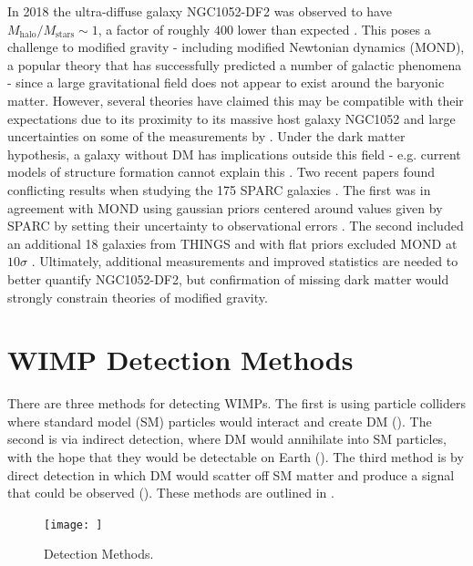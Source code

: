 In 2018 the ultra-diffuse galaxy NGC1052-DF2 was observed to have $M_{\mathrm{halo}} / M_{\mathrm{stars}} \sim 1$, a factor of
roughly $400$
lower than expected .  This poses a challenge to modified gravity - including modified Newtonian
dynamics
(MOND), a popular theory that has successfully predicted a number of galactic phenomena  - since a large
gravitational
field does not appear to exist around the baryonic matter.  However, several theories have claimed this may be compatible with their
expectations due to its proximity to its massive host galaxy NGC1052 and large uncertainties on some of the measurements by
.  Under the dark matter hypothesis, a galaxy without DM has implications outside
this field - e.g. current models of structure formation cannot explain this .  Two recent
papers found conflicting results when studying the 175 SPARC
galaxies .  The first was in agreement with MOND using gaussian priors centered around values given by SPARC by
setting
their uncertainty to observational errors .  The second included an additional 18 galaxies from THINGS
 and with flat priors excluded MOND
at $10 \sigma$ .  Ultimately, additional measurements and improved statistics are needed to better
quantify NGC1052-DF2, but confirmation of missing dark matter would strongly constrain theories of modified gravity.


\section[WIMP Detection Methods][WIMP Detection Methods]{WIMP Detection Methods}
\label{sec:detection}

There are three methods for detecting WIMPs.  The first is using particle colliders where standard model (SM) particles would interact and
create DM ().  The second is via indirect detection, where DM would annihilate into SM particles, with the hope
that they would be detectable
on Earth ().  The third method is by direct detection in which DM would scatter off SM matter and produce
a signal that could be observed ().  These methods are outlined in .

\begin{figure}
\centering
\texttt{[image: ]}
\caption{Detection Methods.}
\label{fig:detection_methods}
\end{figure}


